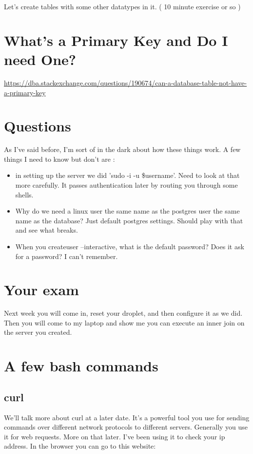 \documentclass[12pt]{article}
\begin{document}
Let's create tables with some other datatypes in it. ( 10 minute exercise or so )

\section{ What's a Primary Key and Do I need One?}
\url{https://dba.stackexchange.com/questions/190674/can-a-database-table-not-have-a-primary-key}

\section{ Questions }
As I've said before, I'm sort of in the dark about how these things work. A few things I need to know but don't are :

\begin{itemize}
\item in setting up the server we did 'sudo -i -u \$username'. Need to look at that more carefully. It passes authentication later by routing you through some shells. 
\item Why do we need a linux user the same name as the postgres user the same name as the database? Just default postgres settings. Should play with that and see what breaks.
\item When you createuser --interactive, what is the default password? Does it ask for a password? I can't remember.
\end{itemize}

\section{Your exam}
Next week you will come in, reset your droplet, and then configure it as we did. Then you will come to my laptop and show me you can execute an inner join on the server you created.

\section{A few bash commands}
\subsection{curl}
We'll talk more about curl at a later date. It's a powerful tool you use for sending commands over different network protocols to different servers. Generally you use it for web requests. More on that later. I've been using it to check your ip address. In the browser you can go to this website:
\end{document}
